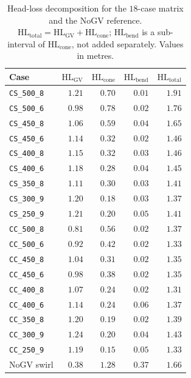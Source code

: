\begin{table}[H]
\centering
\footnotesize
\caption[Head-loss decomposition]{Head-loss decomposition for the $18$-case matrix and the NoGV reference. $\mathrm{HL_{total}} = \mathrm{HL_{GV}} + \mathrm{HL_{cone}}$; $\mathrm{HL_{bend}}$ is a sub-interval of $\mathrm{HL_{cone}}$, not added separately. Values in metres.}
\label{tab:hl-decomposition}
\begin{tabular}{l rrrr}
\hline
Case & $\mathrm{HL_{GV}}$ & $\mathrm{HL_{cone}}$ & $\mathrm{HL_{bend}}$ & $\mathrm{HL_{total}}$ \\ 
\hline
\texttt{CS\_500\_8} & $1.21$ & $0.70$ & $0.01$ & $1.91$ \\
\texttt{CS\_500\_6} & $0.98$ & $0.78$ & $0.02$ & $1.76$ \\
\texttt{CS\_450\_8} & $1.06$ & $0.59$ & $0.04$ & $1.65$ \\
\texttt{CS\_450\_6} & $1.14$ & $0.32$ & $0.02$ & $1.46$ \\
\texttt{CS\_400\_8} & $1.15$ & $0.32$ & $0.03$ & $1.46$ \\
\texttt{CS\_400\_6} & $1.18$ & $0.28$ & $0.04$ & $1.45$ \\
\texttt{CS\_350\_8} & $1.11$ & $0.30$ & $0.03$ & $1.41$ \\
\texttt{CS\_300\_9} & $1.20$ & $0.18$ & $0.03$ & $1.37$ \\
\texttt{CS\_250\_9} & $1.21$ & $0.20$ & $0.05$ & $1.41$ \\
\texttt{CC\_500\_8} & $0.81$ & $0.56$ & $0.02$ & $1.37$ \\
\texttt{CC\_500\_6} & $0.92$ & $0.42$ & $0.02$ & $1.33$ \\
\texttt{CC\_450\_8} & $1.04$ & $0.31$ & $0.02$ & $1.35$ \\
\texttt{CC\_450\_6} & $0.98$ & $0.38$ & $0.02$ & $1.35$ \\
\texttt{CC\_400\_8} & $1.07$ & $0.24$ & $0.02$ & $1.31$ \\
\texttt{CC\_400\_6} & $1.14$ & $0.24$ & $0.06$ & $1.37$ \\
\texttt{CC\_350\_8} & $1.20$ & $0.19$ & $0.02$ & $1.39$ \\
\texttt{CC\_300\_9} & $1.24$ & $0.20$ & $0.04$ & $1.43$ \\
\texttt{CC\_250\_9} & $1.19$ & $0.15$ & $0.05$ & $1.33$ \\
NoGV swirl          & $0.38$ & $1.28$ & $0.37$ & $1.66$ \\
\hline
\end{tabular}
\end{table}



